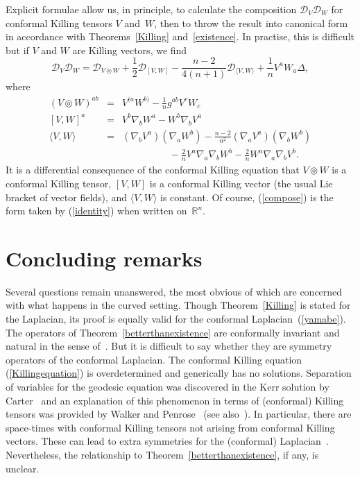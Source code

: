 \documentclass[a4paper,12pt]{amsart}
\newcommand{\topten}{\circledcirc}
\begin{document}
Explicit formulae allow us, in principle, to calculate the composition
${\mathcal D}_V{\mathcal D}_W$ for conformal Killing tensors $V$ and~$W$, then
to throw the result into canonical form in accordance with
Theorems~\ref{Killing} and~\ref{existence}. In practise, this is difficult but
if $V$ and $W$ are Killing vectors, we find
\begin{equation}\label{compose}
{\mathcal D}_V{\mathcal D}_W={\mathcal D}_{V\topten W}
+\frac{1}{2}{\mathcal D}_{[V,W]}
-\frac{n-2}{4(n+1)}{\mathcal D}_{\langle V,W\rangle}+\frac{1}{n}V^aW_a\Delta,
\end{equation}
where
\begin{equation}\label{pairings}\begin{array}{rcl}
(V\topten W)^{ab}&=&V^{(a}W^{b)}-\frac{1}{n}g^{ab}V^cW_c\\[5pt]
[V,W]^a&=&V^b\nabla_bW^a-W^b\nabla_bV^a\\[5pt]
\langle V,W\rangle&=&(\nabla_bV^a)(\nabla_aW^b)
 -\frac{n-2}{n^2}(\nabla_aV^a)(\nabla_bW^b)\\[3pt]
&&\hspace{50pt}\mbox{ }
 -\frac{2}{n}V^a\nabla_a\nabla_bW^b-\frac{2}{n}W^a\nabla_a\nabla_bV^b.
\end{array}\end{equation}
It is a differential consequence of the conformal Killing equation that
$V\topten W$ is a conformal Killing tensor, $[V,W]$ is a conformal Killing
vector (the usual Lie bracket of vector fields), and $\langle V,W\rangle$ is
constant. Of course, (\ref{compose}) is the form taken by (\ref{identity})
when written on~${\mathbb R}^n$.

\section{Concluding remarks}\label{discuss}
Several questions remain unanswered, the most obvious of which are concerned
with what happens in the curved setting. Though Theorem~\ref{Killing} is stated
for the Laplacian, its proof is equally valid for the conformal
Laplacian~(\ref{yamabe}). The operators of Theorem~\ref{betterthanexistence}
are conformally invariant and natural in the sense of~\cite{kms}. But it is
difficult to say whether they are symmetry operators of the conformal
Laplacian. The conformal Killing equation (\ref{Killingequation}) is
overdetermined and generically has no solutions. Separation of variables for
the geodesic equation was discovered in the Kerr solution by Carter~\cite{car}
and an explanation of this phenomenon in terms of (conformal) Killing tensors
was provided by Walker and Penrose~\cite{wp} (see also~\cite{wo}). In
particular, there are space-times with conformal Killing tensors not arising
from conformal Killing vectors. These can lead to extra symmetries for the
(conformal) Laplacian~\cite{km}. Nevertheless, the relationship to
Theorem~\ref{betterthanexistence}, if any, is unclear.
\end{document}
